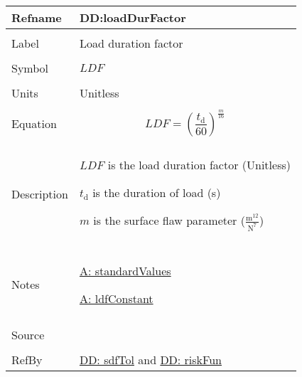 \documentclass[12pt]{article}
\begin{document}
\vspace{\baselineskip}
\noindent
\begin{minipage}{\textwidth}
\begin{tabular}{>{\raggedright}p{}>{\raggedright\arraybackslash}p{}}
\toprule \textbf{Refname} & \textbf{DD:loadDurFactor}
\label{DD:loadDurFactor}
\\ \midrule \\
Label & Load duration factor
        
\\ \midrule \\
Symbol & $LDF$
         
\\ \midrule \\
Units & Unitless
        
\\ \midrule \\
Equation & \begin{displaymath}
           LDF=\left(\frac{{t_{\text{d}}}}{60}\right)^{\frac{m}{16}}
           \end{displaymath}
\\ \midrule \\
Description & \begin{symbDescription}
              \item{$LDF$ is the load duration factor (Unitless)}
              \item{${t_{\text{d}}}$ is the duration of load (s)}
              \item{$m$ is the surface flaw parameter ($\frac{\text{m}^{12}}{\text{N}^{7}}$)}
              \end{symbDescription}
\\ \midrule \\
Notes & \hyperref[assumpSV]{A: standardValues}
        
        \hyperref[assumpLDFC]{A: ldfConstant}
        
\\ \midrule \\
Source & \cite{astm2009}
         
\\ \midrule \\
RefBy & \hyperref[DD:sdfTol]{DD: sdfTol} and \hyperref[DD:riskFun]{DD: riskFun}
        
\\ \bottomrule
\end{tabular}
\end{minipage}
\end{document}
